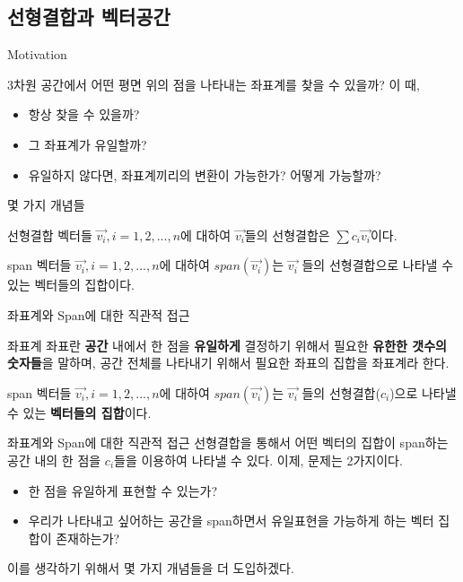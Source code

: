\documentclass{beamer}
\begin{document}
\subsection{선형결합과 벡터공간} 


\begin{frame}{Motivation} 

3차원 공간에서 어떤 평면 위의 점을 나타내는 좌표계를 찾을 수 있을까? 이 때, 

\begin{itemize} 
\item 항상 찾을 수 있을까? 
\item 그 좌표계가 유일할까? 
\item 유일하지 않다면, 좌표계끼리의 변환이 가능한가? 어떻게 가능할까? 
\end{itemize}

\end{frame}

\begin{frame}{몇 가지 개념들} 
\begin{block}{선형결합} 
벡터들 $\vec{v_i}, i=1,2,...,n$에 대하여 $\vec{v_i}$들의 선형결합은 $\sum c_i \vec{v_i}$이다. 
\end{block}

\begin{block}{span} 
벡터들 $\vec{v_i}, i=1,2,...,n$에 대하여 $span(\vec{v_i})$는 $\vec{v_i}$ 들의 선형결합으로 나타낼 수 있는 벡터들의 집합이다. 
\end{block}
\end{frame}



\begin{frame}{좌표계와 Span에 대한 직관적 접근 } 
\begin{block}{좌표계}
좌표란 \textbf{공간} 내에서 한 점을 \textbf{유일하게} 결정하기 위해서 필요한 \textbf{유한한 갯수의 숫자들}을 말하며, 공간 전체를 나타내기 위해서 필요한 좌표의 집합을 좌표계라 한다. 
\end{block}

\begin{block}{span} 
벡터들 $\vec{v_i}, i=1,2,...,n$에 대하여 $span(\vec{v_i})$는 $\vec{v_i}$ 들의 선형결합($c_i$)으로 나타낼 수 있는 \textbf{벡터들의 집합}이다. 
\end{block}
\end{frame}


\begin{frame}{좌표계와 Span에 대한 직관적 접근 } 
선형결합을 통해서 어떤 벡터의 집합이 span하는 공간 내의 한 점을 $c_i$들을 이용하여 나타낼 수 있다. 이제, 문제는 2가지이다. 

\begin{itemize} 
\item 한 점을 유일하게 표현할 수 있는가?
\item 우리가 나타내고 싶어하는 공간을 span하면서 유일표현을 가능하게 하는  벡터 집합이 존재하는가?
\end{itemize}

이를 생각하기 위해서 몇 가지 개념들을 더 도입하겠다. 

\end{frame}
\end{document}
